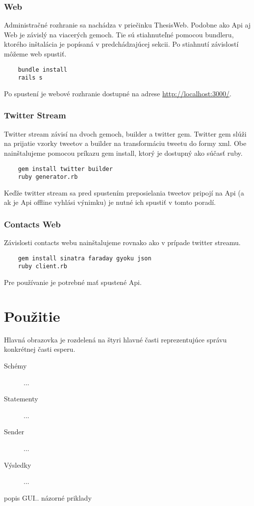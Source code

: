 \subsubsection{Web}
	Administračné rozhranie sa nachádza v priečinku ThesisWeb. Podobne ako Api aj Web je závislý na viacerých gemoch. Tie sú stiahnuteľné pomocou bundleru, ktorého inštalácia je popísaná v predchádzajúcej sekcii. Po stiahnutí závislostí môžeme web spustiť.
	\begin{lstlisting}
	bundle install
	rails s
	\end{lstlisting}
	Po spustení je webové rozhranie dostupné na adrese \url{http://localhost:3000/}.
		
\subsubsection{Twitter Stream}
	Twitter stream závisí na dvoch gemoch, builder a twitter gem. Twitter gem slúži na prijatie vzorky tweetov a builder na transformáciu tweetu do formy xml. Obe nainštalujeme pomocou príkazu gem install, ktorý je dostupný ako súčasť ruby.
	\begin{lstlisting}
	gem install twitter builder
	ruby generator.rb
	\end{lstlisting}
	Keďže twitter stream sa pred spustením preposielania tweetov pripojí na Api (a ak je Api offline vyhlási výnimku) je nutné ich spustiť v tomto poradí.
	
\subsubsection{Contacts Web}
	Závislosti contacts webu nainštalujeme rovnako ako v prípade twitter streamu.		
	\begin{lstlisting}
	gem install sinatra faraday gyoku json
	ruby client.rb
	\end{lstlisting}
	Pre používanie je potrebné mať spustené Api.

\section{Použitie}
	Hlavná obrazovka je rozdelená na štyri hlavné časti reprezentujúce správu konkrétnej časti esperu.
	\begin{description}
		\item[Schémy] ...
		\item[Statementy] ...
		\item[Sender] ...
		\item[Výsledky] ...
	\end{description}
popis GUI..
názorné priklady
